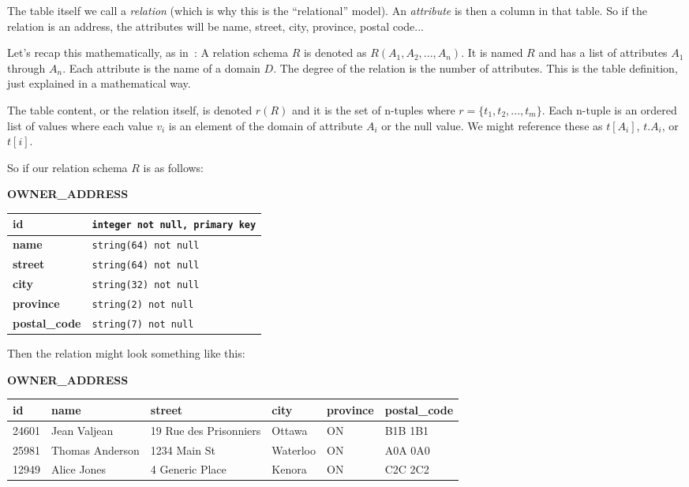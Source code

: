 \documentclass[a4paper]{report}
\begin{document}
The table itself we call a \textit{relation} (which is why this is the ``relational'' model). An \textit{attribute} is then a column in that table. So if the relation is an address, the attributes will be name, street, city, province, postal code... 

Let's recap this mathematically, as in~\cite{fds}: A relation schema $R$ is denoted as $R(A_{1}, A_{2}, ..., A_{n})$. It is named $R$ and has a list of attributes $A_{1}$ through $A_{n}$. Each attribute is the name of a domain $D$. The degree of the relation is the number of attributes. This is the table definition, just explained in a mathematical way.

The table content, or the relation itself, is denoted $r(R)$ and it is the set of n-tuples where $r = \{t_{1}, t_{2}, ..., t_{m}\}$. Each n-tuple is an ordered list of values where each value $v_{i}$ is an element of the domain of attribute $A_{i}$ or the null value. We might reference these as $t[A_{i}]$, $t.A_{i}$, or $t[i]$. 

So if our relation schema $R$ is as follows:
\begin{center}
		\textbf{OWNER\_ADDRESS}\\
	\begin{tabular}{|l|l|}\hline
		\textbf{id} & \texttt{integer not null,  primary key}\\ \hline
		\textbf{name} & \texttt{string(64) not null}\\ \hline
		\textbf{street} & \texttt{string(64) not null}\\ \hline
		\textbf{city} & \texttt{string(32) not null}\\ \hline
		\textbf{province} & \texttt{string(2) not null}\\ \hline
		\textbf{postal\_code} & \texttt{string(7) not null}\\ \hline

	\end{tabular}
\end{center}

Then the relation might look something like this:
\begin{center}
		\textbf{OWNER\_ADDRESS}\\
	\begin{tabular}{|l|l|l|l|l|l|}\hline
		\textbf{id} & \textbf{name} &\textbf{street} & \textbf{city} & \textbf{province} & \textbf{postal\_code} \\ \hline
		24601 & Jean Valjean & 19 Rue des Prisonniers & Ottawa & ON & B1B 1B1\\ \hline
		25981 & Thomas Anderson & 1234 Main St & Waterloo & ON & A0A 0A0\\ \hline
		12949 & Alice Jones & 4 Generic Place & Kenora & ON & C2C 2C2\\ \hline
	\end{tabular}
\end{center}
\end{document}
